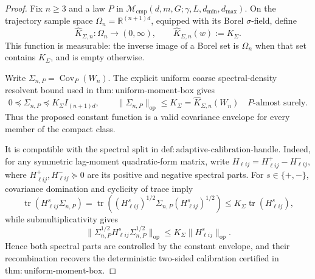 \documentclass{article}
\begin{document}
\begin{proof}
Fix \(n\geq3\) and a law \(P\) in
\(\mathcal M_{\mathrm{cmp}}(d,m,G;\gamma,L,d_{\min},d_{\max})\).  On the
trajectory sample space \(\Omega_n=\mathbb R^{(n+1)d}\), equipped with its
Borel \(\sigma\)-field, define
\[
 \widehat K_{\Sigma,n}:\Omega_n\longrightarrow(0,\infty),
 \qquad
 \widehat K_{\Sigma,n}(w):=K_\Sigma.
\]
This function is measurable: the inverse image of a Borel set is
\(\Omega_n\) when that set contains \(K_\Sigma\), and is empty otherwise.

Write \(\Sigma_{n,P}=\operatorname{Cov}_P(W_n)\).  The explicit uniform
coarse spectral-density resolvent bound used in
\(\mathrm{thm{:}uniform\mbox{-}moment\mbox{-}box}\) gives
\[
 0\preceq\Sigma_{n,P}\preceq K_\Sigma I_{(n+1)d},
 \qquad
 \|\Sigma_{n,P}\|_{\mathrm{op}}
 \leq K_\Sigma=\widehat K_{\Sigma,n}(W_n)
 \quad P\text{-almost surely}.
\]
Thus the proposed constant function is a valid covariance envelope for
every member of the compact class.

It is compatible with the spectral split in
\(\mathrm{def{:}adaptive\mbox{-}calibration\mbox{-}handle}\).  Indeed,
for any symmetric lag-moment quadratic-form matrix, write
\(H_{\ell ij}=H_{\ell ij}^{+}-H_{\ell ij}^{-}\), where
\(H_{\ell ij}^{+},H_{\ell ij}^{-}\succeq0\) are its positive and negative
spectral parts.  For \(s\in\{+,-\}\), covariance domination and cyclicity
of trace imply
\[
 \operatorname{tr}(H_{\ell ij}^{s}\Sigma_{n,P})
 =\operatorname{tr}\!\left((H_{\ell ij}^{s})^{1/2}
 \Sigma_{n,P}(H_{\ell ij}^{s})^{1/2}\right)
 \leq K_\Sigma\operatorname{tr}(H_{\ell ij}^{s}),
\]
while submultiplicativity gives
\[
 \bigl\|\Sigma_{n,P}^{1/2}H_{\ell ij}^{s}
 \Sigma_{n,P}^{1/2}\bigr\|_{\mathrm{op}}
 \leq K_\Sigma\|H_{\ell ij}^{s}\|_{\mathrm{op}}.
\]
Hence both spectral parts are controlled by the constant envelope, and
their recombination recovers the deterministic two-sided calibration
certified in \(\mathrm{thm{:}uniform\mbox{-}moment\mbox{-}box}\).


\end{proof}
\end{document}
